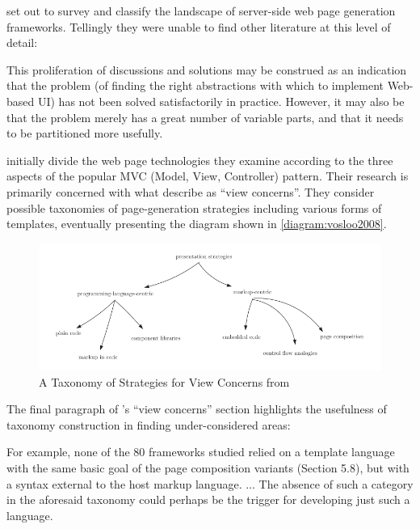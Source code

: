 \citet{Vosloo2008} set out to survey and classify the landscape of server-side web page generation frameworks. Tellingly they were unable to find other literature at this level of detail:

\begin{displayquote}
This proliferation of discussions and solutions may be construed as an indication that the problem (of finding the right abstractions with which to implement Web-based UI) has not been solved satisfactorily in practice. However, it may also be that the problem merely has a great number of variable parts, and that it needs to be partitioned more usefully. \citep{Vosloo2008}
\end{displayquote}

\citeauthor{Vosloo2008} initially divide the web page technologies they examine according to the three aspects of the popular MVC (Model, View, Controller) pattern. Their research is primarily concerned with what \citeauthor{Vosloo2008} describe as \enquote{view concerns}. They consider possible taxonomies of page-generation strategies including various forms of templates, eventually presenting the diagram shown in \autoref{diagram:vosloo2008}.

\begin{figure}[ht!]
\centering
\includegraphics[width=130mm]{Figures/taxonomy.png}
\caption{A Taxonomy of Strategies for View Concerns from \citet{Vosloo2008}}
\label{diagram:vosloo2008}
\end{figure}

The final paragraph of \citet{Vosloo2008}'s \enquote{view concerns} section highlights the usefulness of taxonomy construction in finding under-considered areas:

\begin{displayquote}
For example, none of the 80 frameworks studied relied on a template language with the same basic goal of the page composition variants (Section 5.8), but with a syntax external to the host markup language. ... The absence of such a category in the aforesaid taxonomy could perhaps be the trigger for developing just such a language. \citep{Vosloo2008}
\end{displayquote}

